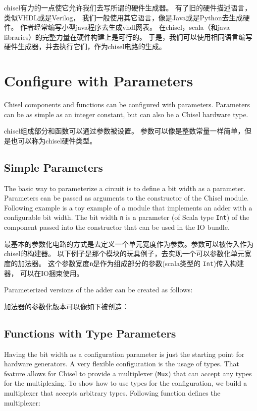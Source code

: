 \documentclass[%
    10pt,
    headinclude, footexclude,
    openright, %
    notitlepage,
    cleardoubleempty,
    headsepline,
    pointlessnumbers,
    bibtotoc, idxtotoc,
    ]{scrbook}
\newcommand{\code}[1]{{\small{\texttt{#1}}}}
\begin{document}
{chisel有力的一点使它允许我们去写所谓的硬件生成器。
有了旧的硬件描述语言，类似VHDL或是Verilog，
我们一般使用其它语言，像是Java或是Python去生成硬件。
作者经常编写小型java程序去生成vhdl网表。
在chisel，scala（和java libraries）的完整力量在硬件构建上是可行的。
于是，我们可以使用相同语言编写硬件生成器，并去执行它们，作为chisel电路的生成。

\section{Configure with Parameters}

Chisel components and functions can be configured with parameters.
Parameters can be as simple as an integer constant, but can also be a Chisel
hardware type.

chisel组成部分和函数可以通过参数被设置。
参数可以像是整数常量一样简单，但是也可以称为chisel硬件类型。

\subsection{Simple Parameters}

The basic way to parameterize a circuit is to define a bit width as a parameter.
Parameters can be passed as arguments to
the constructor of the Chisel module. Following example is a toy example of
a module that implements an adder with a configurable bit width.
The bit width \code{n} is a parameter (of Scala type \code{Int}) of the component
passed into the constructor that can be used in the IO bundle.

最基本的参数化电路的方式是去定义一个单元宽度作为参数。参数可以被传入作为chisel的构建器。
以下例子是那个模块的玩具例子，去实现一个可以参数化单元宽度的加法器。
这个参数宽度\code{n}是作为组成部分的参数(scala类型的 \code{Int})传入构建器，
可以在IO捆束使用。


\noindent Parameterized versions of the adder can be created as follows:

\noindent 加法器的参数化版本可以像如下被创造：


\subsection{Functions with Type Parameters}

Having the bit width as a configuration parameter is just the starting point for
hardware generators. A very flexible configuration is the usage of types.
That feature allows for Chisel to provide a multiplexer (\code{Mux}) that
can accept any types for the multiplexing.
To show how to use types for the configuration, we build a multiplexer
that accepts arbitrary types. Following function defines the multiplexer:

}
\end{document}
